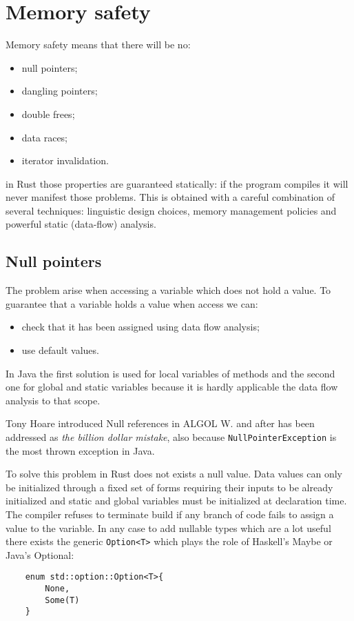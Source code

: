 \section{Memory safety}
Memory safety means that there will be no:
\begin{itemize}
    \item null pointers;
    \item dangling pointers;
    \item double frees;
    \item data races;
    \item iterator invalidation.
\end{itemize}
in Rust those properties are guaranteed statically: if the program compiles it will never manifest those problems.
This is obtained with a careful combination of several techniques: linguistic design choices, memory management policies and powerful static (data-flow) analysis.

\subsection{Null pointers}
The problem arise when accessing a variable which does not hold a value.
To guarantee that a variable holds a value when access we can:
\begin{itemize}
    \item check that it has been assigned using data flow analysis;

    \item use default values.
\end{itemize}
In Java the first solution is used for local variables of methods and the second one for global and static variables because it is hardly applicable the data flow analysis to that scope.

Tony Hoare introduced Null references in ALGOL W. and after has been addressed as \emph{the billion dollar mistake}, also because \verb|NullPointerException| is the most thrown exception in Java.

To solve this problem in Rust does not exists a null value.
Data values can only be initialized through a fixed set of forms requiring their inputs to be already initialized and static and global variables must be initialized at declaration time.
The compiler refuses to terminate build if any branch of code fails to assign a value to the variable.
In any case to add nullable types which are a lot useful there exists the generic \verb|Option<T>| which plays the role of Haskell's Maybe or Java's Optional:
\begin{verbatim}
    enum std::option::Option<T>{
        None,
        Some(T)
    }
\end{verbatim}

